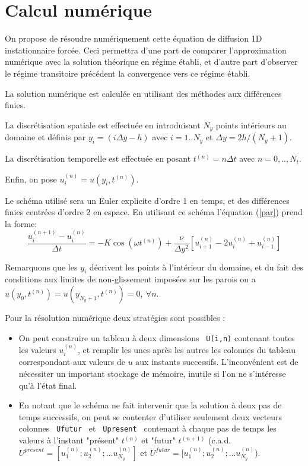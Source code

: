 \documentclass[a4,12pt]{article}
\begin{document}
\section{Calcul num\'erique}
On propose de r\'esoudre num\'eriquement cette \'equation de diffusion 
1D instationnaire forc\'ee.
Ceci permettra d'une part de comparer l'approximation numérique avec
la solution théorique en régime établi, et d'autre part d'observer
le régime transitoire précédent la convergence vers ce régime établi.

 La solution num\'erique est calcul\'ee en utilisant des m\'ethodes aux diff\'erences finies.


La discrétisation spatiale est effectuée en introduisant $N_y$ points intérieurs au domaine et définis
par $y_i = (i \Delta y -h)$ avec $i=1..N_y$ et $\Delta y = 2 h /(N_y+1)$.

La discrétisation temporelle est effectuée en posant  $t^{(n)}=n\Delta t$ avec $n=0,..,N_t$.

Enfin, on pose $u_i^{(n)} = u(y_i,t^{(n)})$.

Le sch\'ema utilis\'e sera un Euler explicite d'ordre 1 en temps, et des diff\'erences finies centr\'ees d'ordre 2 en espace.
En utilisant ce schéma l'\'equation (\ref{par}) prend la forme:
\begin{equation}
\label{disc}
\frac{u_i^{(n+1)}-u_i^{(n)}}{\Delta t}=- K \cos( \omega t^{(n)} ) + \frac{\nu}{\Delta y^2} 
\left[ u_{i+1}^{(n)}-2u_i^{(n)}+u_{i-1}^{(n)} \right] 
\end{equation}
\noindent


Remarquons que les $y_i$ d\'ecrivent les points \`a l'int\'erieur du domaine, et du fait des conditions aux limites 
de non-glissement impos\'ees sur les parois on a $u(y_0,t^{(n)})=u(y_{N_y+1},t^{(n)})=0, \ \forall n$.

Pour la résolution numérique deux stratégies sont possibles :
\begin{itemize}
\item 
On peut construire un tableau à deux dimensions \verb| U(i,n)| contenant toutes les valeurs $u_{i}^{(n)}$, et remplir les unes après les autres les colonnes du tableau correspondant aux valeurs de $u$ aux instants successifs. L'inconvénient est de nécessiter un important stockage de mémoire, inutile si l'on ne s'intéresse qu'à l'état final.
\item 
En notant que le schéma ne fait intervenir que la solution à deux pas de temps successifs, on peut se contenter d'utiliser seulement deux vecteurs colonnes 
\verb| Ufutur | et \verb| Upresent |  contenant à chaque pas de temps les valeurs à l'instant 
"présent" $t^{(n)}$ et "futur"  $t^{(n+1)}$ (c.a.d. $ U^{present} = [u_1^{(n)}; u_2^{(n)}; ... u_{N_y}^{(n)} ] $ et   $U^{futur} = [u_1^{(n)}; u_2^{(n)}; ... u_{N_y}^{(n)}$).
\end{itemize}
\end{document}
